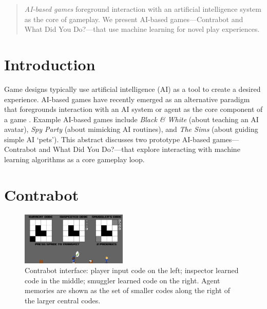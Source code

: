 \documentclass{sig-alternate}
\begin{document}
\toappear{}

\maketitle
\begin{abstract}
{\it AI-based games} foreground interaction with an artificial intelligence system as the core of gameplay.
We present AI-based games---{\sc Contrabot} and {\sc What Did You Do?}---that use machine learning for novel play experiences.
\end{abstract}

%
%


\section{Introduction}

\noindent Game designs typically use artificial intelligence (AI) as a tool to create a desired experience.
AI-based games have recently emerged as an alternative paradigm that foregrounds interaction with an AI system or agent as the core component of a game \cite{eladhari2011:ai-based-games, treanor2015:ai-based-games}.
Example AI-based games include {\it Black \& White} (about teaching an AI avatar), {\it Spy Party} (about mimicking AI routines), and {\it The Sims} (about guiding simple AI `pets').
This abstract discusses two prototype AI-based games---{\sc Contrabot} and {\sc What Did You Do?}---that explore interacting with machine learning algorithms as a core gameplay loop.

\section{Contrabot}

\begin{figure}[tb]
\centering
\includegraphics[width=0.45\textwidth]{images/contrabot}
\caption{{\sc Contrabot} interface: player input code on the left; inspector learned code in the middle; smuggler learned code on the right. 
Agent memories are shown as the set of smaller codes along the right of the larger central codes.}
\label{fig:contrabot}
\end{figure}
\end{document}
